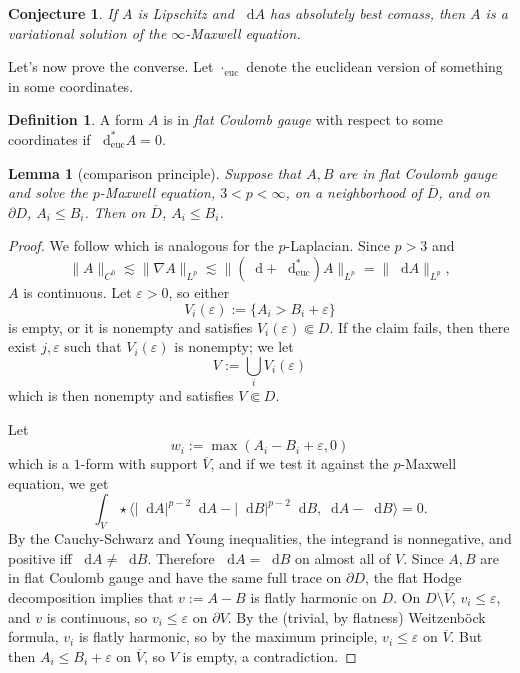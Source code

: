 \documentclass[reqno,11pt]{amsart}
\newcommand*\dif{\mathop{}\!\mathrm{d}}
\newcommand{\dfn}[1]{\emph{#1}\index{#1}}
\newcommand{\euc}{\mathrm{euc}}
\newtheorem{lemma}[theorem]{Lemma}
\newtheorem{conjecture}[theorem]{Conjecture}
\theoremstyle{definition}
\newtheorem{definition}[theorem]{Definition}
\numberwithin{equation}{section}
\begin{document}
\begin{conjecture}
If $A$ is Lipschitz and $\dif A$ has absolutely best comass, then $A$ is a variational solution of the $\infty$-Maxwell equation.
\end{conjecture}

Let's now prove the converse.
Let $\cdot_\euc$ denote the euclidean version of something in some coordinates.

\begin{definition}
A form $A$ is in \dfn{flat Coulomb gauge} with respect to some coordinates if $\dif^*_\euc A = 0$.
\end{definition}

\begin{lemma}[comparison principle]
Suppose that $A, B$ are in flat Coulomb gauge and solve the $p$-Maxwell equation, $3 < p < \infty$, on a neighborhood of $\overline D$, and on $\partial D$, $A_i \leq B_i$.
Then on $\overline D$, $A_i \leq B_i$.
\end{lemma}
\begin{proof}
We follow \cite[Theorem 2.15]{lindqvist2019notes} which is analogous for the $p$-Laplacian.
Since $p > 3$ and
$$\|A\|_{C^0} \lesssim \|\nabla A\|_{L^p} \lesssim \|(\dif + \dif_\euc^*) A\|_{L^p} = \|\dif A\|_{L^p},$$
$A$ is continuous.
Let $\varepsilon > 0$, so either
$$V_i(\varepsilon) := \{A_i > B_i + \varepsilon\}$$
is empty, or it is nonempty and satisfies $V_i(\varepsilon) \Subset D$.
If the claim fails, then there exist $j, \varepsilon$ such that $V_i(\varepsilon)$ is nonempty; we let 
$$V := \bigcup_i V_i(\varepsilon)$$
which is then nonempty and satisfies $V \Subset D$. 

Let
$$w_i := \max(A_i - B_i + \varepsilon, 0)$$
which is a $1$-form with support $\overline V$, and if we test it against the $p$-Maxwell equation, we get
$$\int_V \star \langle |\dif A|^{p - 2} \dif A - |\dif B|^{p - 2} \dif B, \dif A - \dif B\rangle = 0.$$
By the Cauchy-Schwarz and Young inequalities, the integrand is nonnegative, and positive iff $\dif A \neq \dif B$.
Therefore $\dif A = \dif B$ on almost all of $V$.
Since $A, B$ are in flat Coulomb gauge and have the same full trace on $\partial D$, the flat Hodge decomposition implies that $v := A - B$ is flatly harmonic on $D$.
On $D \setminus \overline V$, $v_i \leq \varepsilon$, and $v$ is continuous, so $v_i \leq \varepsilon$ on $\partial V$.
By the (trivial, by flatness) Weitzenb\"ock formula, $v_i$ is flatly harmonic, so by the maximum principle, $v_i \leq \varepsilon$ on $\overline V$.
But then $A_i \leq B_i + \varepsilon$ on $\overline V$, so $V$ is empty, a contradiction.
\end{proof}
\end{document}
